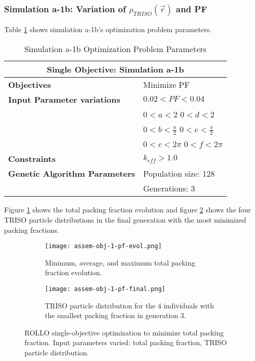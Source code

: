 \subsubsection{Simulation a-1b: Variation of $\rho_{TRISO}(\vec{r})$ and PF}
Table \ref{tab:simulationa1b} shows simulation a-1b's optimization problem parameters. 
\begin{table}[htbp]
    \centering
    \onehalfspacing
    \caption{Simulation a-1b Optimization Problem Parameters}
	\label{tab:simulationa1b}
    \footnotesize
    \begin{tabular}{l|p{3cm}}
    \hline 
    \multicolumn{2}{c}{\textbf{Single Objective: Simulation a-1b}} \\
    \hline 
    \textbf{Objectives} & Minimize PF \\
    \hline 
    \textbf{Input Parameter variations} & $0.02<PF<0.04$ \\
    & $0<a<2$ $0<d<2$\\
    & $0<b<\frac{\pi}{2}$ $0<e<\frac{\pi}{2}$\\
    & $0<c<2\pi$ $0<f<2\pi$\\
    \hline
    \textbf{Constraints} & $k_{eff} > 1.0$\\ 
    \hline 
    \textbf{Genetic Algorithm Parameters} & Population size: 128 \\
    & Generations: 3 \\
    \hline
    \end{tabular}
\end{table}
Figure \ref{fig:assem-obj-1-pf-evol} shows the total packing fraction evolution and 
figure \ref{fig:assem-obj-1-pf-final} shows the four TRISO particle distributions in 
the final generation with the most minimized packing fractions. 
\begin{figure}[htbp]
    \centering
    \begin{subfigure}{\textwidth}
        \texttt{[image: assem-obj-1-pf-evol.png]}
        \caption{Minimum, average, and maximum total packing fraction evolution.}
        \label{fig:assem-obj-1-pf-evol} 
    \end{subfigure}
    \begin{subfigure}{\textwidth}
        \texttt{[image: assem-obj-1-pf-final.png]}
        \caption{TRISO particle distribution for the 4 individuals with the 
        smallest packing fraction in generation 3.}
        \label{fig:assem-obj-1-pf-final} 
    \end{subfigure}
    \caption{ROLLO single-objective optimization to minimize total packing fraction. 
    Input parameters varied: total packing fraction, TRISO particle distribution.}
    \label{fig:assem-obj-1-pf}
\end{figure}
